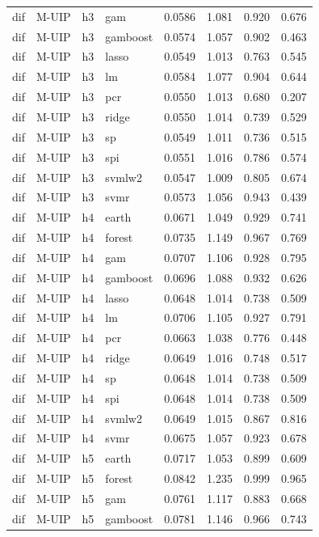 \begin{ThreePartTable}
\begin{longtable}[t]{llclcccc}
dif & M-UIP & h3 & gam & 0.0586 & 1.081 & 0.920 & 0.676\\
dif & M-UIP & h3 & gamboost & 0.0574 & 1.057 & 0.902 & 0.463\\
dif & M-UIP & h3 & lasso & 0.0549 & 1.013 & 0.763 & 0.545\\
dif & M-UIP & h3 & lm & 0.0584 & 1.077 & 0.904 & 0.644\\
dif & M-UIP & h3 & pcr & 0.0550 & 1.013 & 0.680 & 0.207\\
dif & M-UIP & h3 & ridge & 0.0550 & 1.014 & 0.739 & 0.529\\
dif & M-UIP & h3 & sp & 0.0549 & 1.011 & 0.736 & 0.515\\
dif & M-UIP & h3 & spi & 0.0551 & 1.016 & 0.786 & 0.574\\
dif & M-UIP & h3 & svmlw2 & 0.0547 & 1.009 & 0.805 & 0.674\\
dif & M-UIP & h3 & svmr & 0.0573 & 1.056 & 0.943 & 0.439\\
\addlinespace
dif & M-UIP & h4 & earth & 0.0671 & 1.049 & 0.929 & 0.741\\
dif & M-UIP & h4 & forest & 0.0735 & 1.149 & 0.967 & 0.769\\
dif & M-UIP & h4 & gam & 0.0707 & 1.106 & 0.928 & 0.795\\
dif & M-UIP & h4 & gamboost & 0.0696 & 1.088 & 0.932 & 0.626\\
dif & M-UIP & h4 & lasso & 0.0648 & 1.014 & 0.738 & 0.509\\
dif & M-UIP & h4 & lm & 0.0706 & 1.105 & 0.927 & 0.791\\
dif & M-UIP & h4 & pcr & 0.0663 & 1.038 & 0.776 & 0.448\\
dif & M-UIP & h4 & ridge & 0.0649 & 1.016 & 0.748 & 0.517\\
dif & M-UIP & h4 & sp & 0.0648 & 1.014 & 0.738 & 0.509\\
dif & M-UIP & h4 & spi & 0.0648 & 1.014 & 0.738 & 0.509\\
dif & M-UIP & h4 & svmlw2 & 0.0649 & 1.015 & 0.867 & 0.816\\
dif & M-UIP & h4 & svmr & 0.0675 & 1.057 & 0.923 & 0.678\\
\addlinespace
dif & M-UIP & h5 & earth & 0.0717 & 1.053 & 0.899 & 0.609\\
dif & M-UIP & h5 & forest & 0.0842 & 1.235 & 0.999 & 0.965\\
dif & M-UIP & h5 & gam & 0.0761 & 1.117 & 0.883 & 0.668\\
dif & M-UIP & h5 & gamboost & 0.0781 & 1.146 & 0.966 & 0.743\\

\end{longtable}
\end{ThreePartTable}
